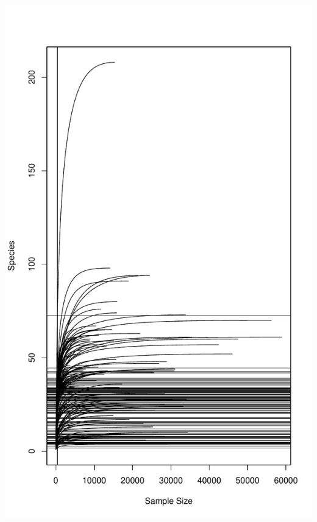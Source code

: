\documentclass[
]{article}
\begin{document}
\includegraphics[width=1\linewidth]{manuscript_template_files/figure-latex/unnamed-chunk-20-2}
\end{document}
